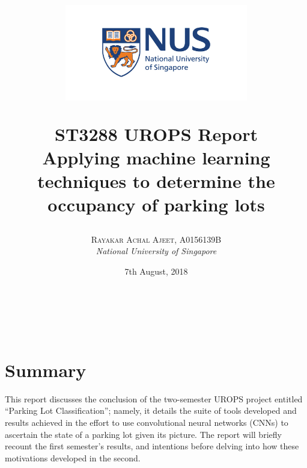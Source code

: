 \documentclass[a4paper, 11pt]{article} %
\title{
	\begin{figure}
		\begin{center}
					\includegraphics[width=8cm]{figures/logo.jpg}
		\end{center}
	\end{figure}	
	\textbf{ST3288 UROPS Report
}\\
Applying machine learning techniques to determine the occupancy of parking lots}
\author{\textsc{Rayakar Achal Ajeet, A0156139B}\\
		\textit{National University of Singapore}
}
\date{7th August, 2018}
\makeatletter
\renewcommand{\maketitle}{
\begin{flushright}
	{\LARGE\@title}
	\vspace{50pt} \\
	{\large\@author}
	\\\@date
	\vspace{40pt}
\end{flushright}
}
\makeatother
\begin{document}
\maketitle %

\newpage

\tableofcontents

\newpage

\section{Summary}
    This report discusses the conclusion of the two-semester UROPS project entitled ``Parking Lot
    Classification''; namely, it details the suite of tools developed and results achieved in the effort to use
    convolutional neural networks (CNNs) to ascertain the state of a parking lot given its picture. The 
    report will briefly recount the first semester's results, and intentions before delving into how these 
    motivations developed in the second.
\end{document}
